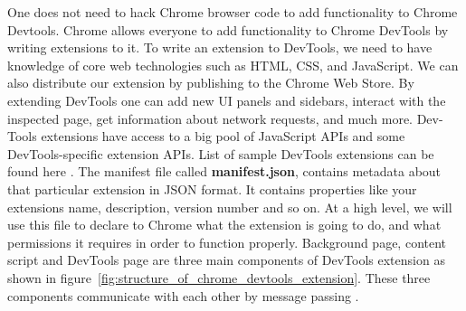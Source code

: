 One does not need to hack Chrome browser code to add functionality to Chrome Devtools. Chrome allows everyone to add functionality to Chrome DevTools by writing extensions to it. To write an extension to DevTools, we need to have knowledge of core web technologies such as HTML, CSS, and JavaScript. We can also distribute our extension by publishing to the Chrome Web Store. By extending DevTools one can add new UI panels and sidebars, interact with the inspected page, get information about network requests, and much more. Dev-Tools extensions have access to a big pool of JavaScript APIs \cite{CDJAPIs} and some DevTools-specific extension APIs. List of sample DevTools extensions can be found here \cite{CDSampExt}.
The manifest file called \textbf{manifest.json}, contains metadata about that particular extension in JSON format. It contains properties like your extension\textquotesingle s name, description, version number and so on. At a high level, we will use this file to declare to Chrome what the extension is going to do, and what permissions it requires in order to function properly.
Background page, content script and DevTools page are three main components of DevTools extension as shown in figure~\ref{fig:structure_of_chrome_devtools_extension}. These three components communicate with each other by message passing \cite{CDMesgPassing}.


